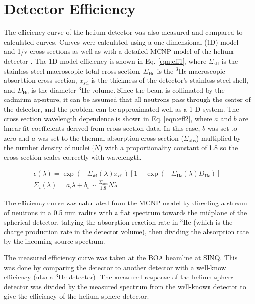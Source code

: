 \documentclass[5p,12pt]{elsarticle}
\begin{document}
%
%
%
%
%

%
%
%
%
%


\section{Detector Efficiency}
\label{sec:eff}

The efficiency curve of the helium detector was also measured and compared to calculated curves.  Curves were calculated using a one-dimensional (1D) model and 1/v cross sections as well as with a detailed MCNP model of the helium detector \cite{bonner_manual}.  The 1D model efficiency is shown in Eq. \ref{eqn:eff1}, where $\Sigma_{\textrm{stl}}$ is the stainless steel macroscopic total cross section, $\Sigma_{\textrm{He}}$ is the $^3$He macroscopic absorbtion cross section, $x_{\textrm{stl}}$ is the thickness of the detector's stainless steel shell, and  $D_{\textrm{He}}$ is the diameter $^3$He volume.  Since the beam is collimated by the cadmium aperture, it can be assumed that all neutrons pass through the center of the detector, and the problem can be approximated well as a 1-D system.  The cross section wavelength dependence is shown in Eq. \ref{eqn:eff2}, where $a$ and $b$ are linear fit coefficients derived from cross section data.  In this case, $b$ was set to zero and $a$ was set to the thermal absorption cross section ($\Sigma_{\textrm{abs}}$) multiplied by the number density of nuclei ($N$) with a proportionality constant of 1.8 so the cross section scales correctly with wavelength.

\begin{gather}
     \label{eqn:eff1} \epsilon(\lambda) = \exp \left(-\Sigma_{\textrm{stl}}(\lambda) x_{\textrm{stl}}\right)[1-\exp(-\Sigma_{\textrm{He}}(\lambda) D_{\textrm{He}})] \\
     \label{eqn:eff2} \Sigma_i(\lambda) = a_i\lambda+b_i  \sim  \frac{\Sigma_{\textrm{abs}}}{1.8} N \lambda 
\end{gather}

The efficiency curve was calculated from the MCNP model by directing a stream of neutrons in a 0.5 mm radius with a flat spectrum towards the midplane of the spherical detector, tallying the absorption reaction rate in $^{3}$He (which is the charge production rate in the detector volume), then dividing the absorption rate by the incoming source spectrum.  

The measured efficiency curve was taken at the BOA beamline at SINQ.  This was done by comparing the detector to another detector with a well-know efficiency (also a $^3$He detector).  The measured response of the helium sphere detector was divided by the measured spectrum  from the well-known detector to give the efficiency of the helium sphere detector.
\end{document}
